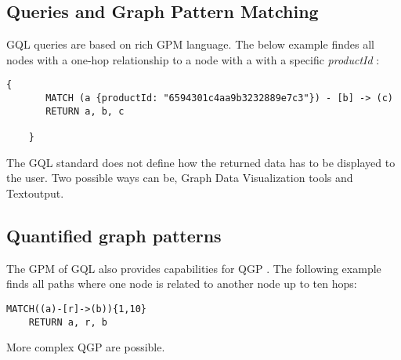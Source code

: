 \subsection{Queries and Graph Pattern Matching}
\label{subsec:iso:examples:queries_and_graph_pattern_matching}
GQL queries are based on rich GPM language.
The below example findes all nodes with a one-hop relationship to a node with a 
with a specific \textit{productId} \citep{hare_isoiec_2024}:
\begin{lstlisting}[caption={Example for one hop graph pattern query}, label={lst:createOneHopGraph}]
    {
       MATCH (a {productId: "6594301c4aa9b3232889e7c3"}) - [b] -> (c)
	   RETURN a, b, c

    }
\end{lstlisting}
The GQL standard does not define how the returned data has to be displayed
to the user. Two possible ways can be, Graph Data Visualization tools and Textoutput.


\subsection{Quantified graph patterns}
\label{subsec:iso:examples:quantified_path_patterns}
The GPM of GQL also provides capabilities for \ac{QGP} \citep{fan_adding_2016}.
The following example finds all paths where one node is related to another node
up to ten hops:
\begin{lstlisting}[caption={Example for quantified graph pattern}, label={lst:createQuantifiedGraph}]
    MATCH((a)-[r]->(b)){1,10}
	RETURN a, r, b
\end{lstlisting}
More complex QGP are possible.

